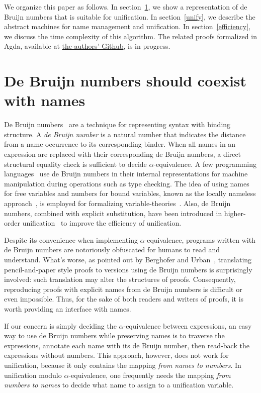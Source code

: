 \documentclass[a4paper,UKenglish]{lipics-v2016}
\begin{document}
  We organize this paper as follows.
  In section~\ref{closures}, we show a representation of
  de Bruijn numbers that is suitable for unification.
  In section~\ref{unify}, we describe the abstract machines
  for name management and unification.
  In section~\ref{efficiency}, we discuss the time complexity of this algorithm.
  The related proofs formalized in Agda,
  available at \href{https://github.com/mvcccccc/UNIF2018}{the authors' Github},
  is in progress.
  

  \section{De Bruijn numbers should coexist with names}
\label{closures}
De Bruijn numbers~\cite{de_bruijn_lambda_1972} are a technique for
representing syntax with binding structure.
A \emph{de Bruijn number} is a natural number that indicates
the distance from a name occurrence to its corresponding binder.
When all names in an expression are replaced with their corresponding de Bruijn numbers,
a direct structural equality check is sufficient to decide $\alpha$-equivalence.
A few programming languages~\cite{norell_towards_2007} use de Bruijn numbers
in their internal representations for machine manipulation during operations such as type checking.
The idea of using names for free variables and numbers for bound variables,
known as the locally nameless approach~\cite{chargueraud_locally_2012},
is employed for formalizing variable-theories~\cite{aydemir_nominal_2006, aydemir_engineering_2008}.
Also, de Bruijn numbers, combined with explicit substitution, have been introduced in
higher-order unification~\cite{dowek_higher_2000} to improve the efficiency of unification.

Despite its convenience when implementing $\alpha$-equivalence,
programs written with de Bruijn numbers are notoriously obfuscated for humans to read and understand.
What's worse, as pointed out by Berghofer and Urban~\cite{berghofer_head--head_2007},
translating pencil-and-paper style proofs to versions using de Bruijn numbers is surprisingly involved:
such translation may alter the structures of proofs.
Consequently, reproducing proofs with explicit names from de Bruijn numbers is difficult or even impossible.
Thus, for the sake of both readers and writers of proofs, it is worth providing an interface with names.

If our concern is simply deciding the $\alpha$-equivalence between expressions,
an easy way to use de Bruijn numbers while preserving names is
to traverse the expressions, annotate each name with its de Bruijn number,
then read-back the expressions without numbers.
This approach, however, does not work for unification,
because it only contains the mapping \emph{from names to numbers}.
In unification modulo $\alpha$-equivalence, one frequently needs
the mapping \emph{from numbers to names} to decide
what name to assign to a unification variable.
\end{document}
